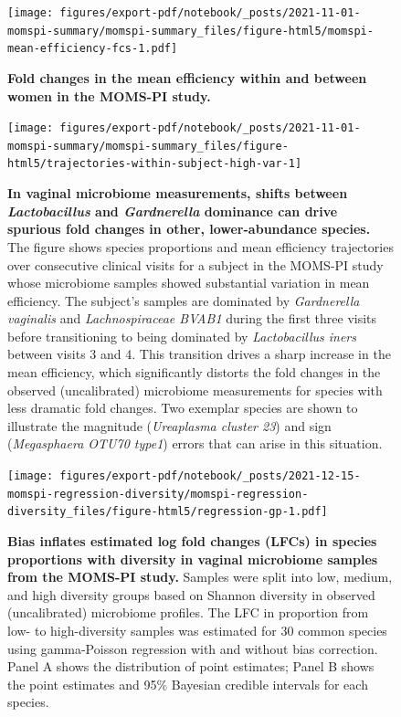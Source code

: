 \documentclass[
]{article}
\begin{document}
\begin{figure}
\centering
\texttt{[image: figures/export-pdf/notebook/\_posts/2021-11-01-momspi-summary/momspi-summary\_files/figure-html5/momspi-mean-efficiency-fcs-1.pdf]}
\caption{\label{fig:momspi-mean-efficiency-fcs}\textbf{Fold changes in the mean efficiency within and between women in the MOMS-PI study.}}
\end{figure}



\begin{figure}
\texttt{[image: figures/export-pdf/notebook/\_posts/2021-11-01-momspi-summary/momspi-summary\_files/figure-html5/trajectories-within-subject-high-var-1]} \caption{\textbf{In vaginal microbiome measurements, shifts between \emph{Lactobacillus} and \emph{Gardnerella} dominance can drive spurious fold changes in other, lower-abundance species.} The figure shows species proportions and mean efficiency trajectories over consecutive clinical visits for a subject in the MOMS-PI study whose microbiome samples showed substantial variation in mean efficiency. The subject's samples are dominated by \emph{Gardnerella vaginalis} and \emph{Lachnospiraceae BVAB1} during the first three visits before transitioning to being dominated by \emph{Lactobacillus iners} between visits 3 and 4. This transition drives a sharp increase in the mean efficiency, which significantly distorts the fold changes in the observed (uncalibrated) microbiome measurements for species with less dramatic fold changes. Two exemplar species are shown to illustrate the magnitude (\emph{Ureaplasma cluster 23}) and sign (\emph{Megasphaera OTU70 type1}) errors that can arise in this situation.}\label{fig:momspi-trajectory}
\end{figure}



\begin{figure}
\centering
\texttt{[image: figures/export-pdf/notebook/\_posts/2021-12-15-momspi-regression-diversity/momspi-regression-diversity\_files/figure-html5/regression-gp-1.pdf]}
\caption{\label{fig:momspi-regression}\textbf{Bias inflates estimated log fold changes (LFCs) in species proportions with diversity in vaginal microbiome samples from the MOMS-PI study.} Samples were split into low, medium, and high diversity groups based on Shannon diversity in observed (uncalibrated) microbiome profiles. The LFC in proportion from low- to high-diversity samples was estimated for 30 common species using gamma-Poisson regression with and without bias correction. Panel A shows the distribution of point estimates; Panel B shows the point estimates and 95\% Bayesian credible intervals for each species.}
\end{figure}
\end{document}

